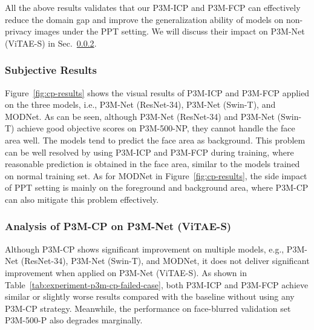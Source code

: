 \documentclass[twocolumn]{svjour3}
\begin{document}
All the above results validates that our P3M-ICP and P3M-FCP can effectively reduce the domain gap and improve the generalization ability of models on non-privacy images under the PPT setting. We will discuss their impact on P3M-Net (ViTAE-S) in Sec.~\ref{subsubsec:cp-vitae}.

\subsubsection{Subjective Results} 
Figure~\ref{fig:cp-results} shows the visual results of P3M-ICP and P3M-FCP applied on the three models, i.e., P3M-Net (ResNet-34), P3M-Net (Swin-T), and MODNet. As can be seen, although P3M-Net (ResNet-34) and P3M-Net (Swin-T) achieve good objective scores on P3M-500-NP, they cannot handle the face area well. The models tend to predict the face area as background. This problem can be well resolved by using P3M-ICP and P3M-FCP during training, where reasonable prediction is obtained in the face area, similar to the models trained on normal training set. As for MODNet in Figure~\ref{fig:cp-results}, the side impact of PPT setting is mainly on the foreground and background area, where P3M-CP can also mitigate this problem effectively.

\subsubsection{Analysis of P3M-CP on P3M-Net (ViTAE-S)}
\label{subsubsec:cp-vitae}
Although P3M-CP shows significant improvement on multiple models, e.g., P3M-Net (ResNet-34), P3M-Net (Swin-T), and MODNet, it does not deliver significant improvement when applied on P3M-Net (ViTAE-S). As shown in Table~\ref{tab:experiment-p3m-cp-failed-case}, both P3M-ICP and P3M-FCP achieve similar or slightly worse results compared with the baseline without using any P3M-CP strategy. Meanwhile, the performance on face-blurred validation set P3M-500-P also degrades marginally.
\end{document}
